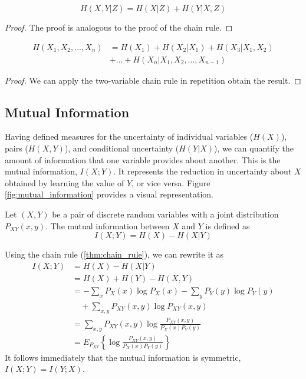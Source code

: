 \begin{corollary}
    \begin{equation*}
        H(X, Y|Z) = H(X|Z) + H(Y|X,Z)
    \end{equation*}
\end{corollary}
\begin{proof}
    The proof is analogous to the proof of the chain rule.
\end{proof}

\begin{corollary}
    \begin{align*}
        H(X_1, X_2, \ldots, X_n) & = H(X_1) + H(X_2|X_1) + H(X_3|X_1, X_2) \nonumber \\
                                 & + \ldots + H(X_n|X_1, X_2, \ldots, X_{n-1})
    \end{align*}
\end{corollary}
\begin{proof}
    We can apply the two-variable chain rule in repetition obtain the result.
\end{proof}

\subsection{Mutual Information}
Having defined measures for the uncertainty of individual variables ($H(X)$), pairs ($H(X,Y)$), and conditional uncertainty ($H(Y|X)$), we can quantify the amount of information that one variable provides about another. This is the mutual information, $I(X;Y)$. It represents the reduction in uncertainty about $X$ obtained by learning the value of $Y$, or vice versa. Figure \ref{fig:mutual_information} provides a visual representation.

\begin{definition}\label{def:mutual_information}
    Let $(X,Y)$ be a pair of discrete random variables with a joint distribution $P_{XY}(x,y)$. The mutual information between $X$ and $Y$ is defined as
    \begin{equation}
        I(X;Y) = H(X) - H(X|Y)
    \end{equation}
\end{definition}
Using the chain rule (\ref{thm:chain_rule}), we can rewrite it as
\begin{align}
    I(X;Y) & = H(X) - H(X|Y) \nonumber                                           \\
           & = H(X) + H(Y) - H(X,Y)                                              \\
           & = -\sum_x P_X(x)\log P_X(x) - \sum_y P_Y(y)\log P_Y(y) \nonumber    \\
           & \quad + \sum_{x,y} P_{XY}(x,y)\log P_{XY}(x,y)                      \\
           & = \sum_{x,y} P_{XY}(x,y)\log \frac{P_{XY}(x,y)}{P_X(x)P_Y(y)}       \\
           & = E_{P_{XY}} \left\{ \log \frac{P_{XY}(x,y)}{P_X(x)P_Y(y)} \right\}
\end{align}
It follows immediately that the mutual information is symmetric, $I(X;Y) = I(Y;X)$.

